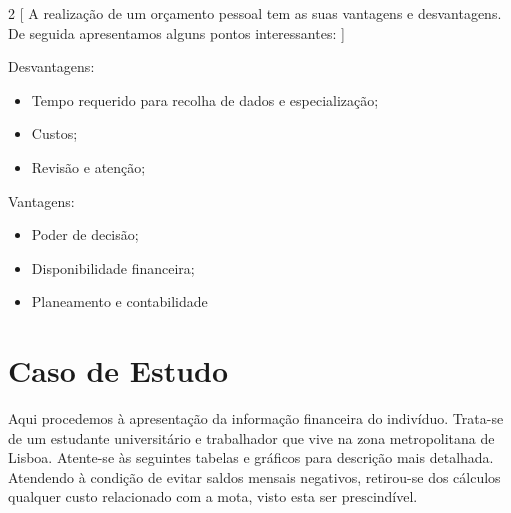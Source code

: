 \documentclass[11pt]{report}
\begin{document}
\pagebreak
\begin{multicols}{2}
[ A realização de um orçamento pessoal tem as suas vantagens e desvantagens\cite{cohen}. De seguida apresentamos alguns pontos interessantes: ]

Desvantagens:
\begin{itemize}
	\item Tempo requerido para recolha de dados e especialização;
	\item Custos; 
	\item Revisão e atenção; 
\end{itemize}
Vantagens:
\begin{itemize}
	\item Poder de decisão; 
	\item Disponibilidade financeira; 
	\item Planeamento e contabilidade
\end{itemize}
\end{multicols}



\chapter{Caso de Estudo}
Aqui procedemos à apresentação da informação financeira do indivíduo. Trata-se de um estudante universitário e trabalhador que vive na zona metropolitana de Lisboa. Atente-se às seguintes tabelas e gráficos para descrição mais detalhada.
Atendendo à condição de evitar saldos mensais negativos, retirou-se dos cálculos qualquer custo relacionado com a mota, visto esta ser prescindível.
\end{document}
